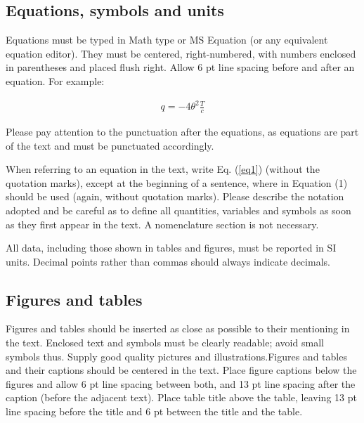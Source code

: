 \documentclass{cilamce19}
\begin{document}
\subsection{Equations, symbols and units} 
Equations must be typed in Math type or MS Equation (or any equivalent equation editor). They must be centered, right-numbered, with numbers enclosed in parentheses and placed flush right. Allow 6 pt line spacing before and after an equation. For example:

\begin{eqnarray}
q =-4 \theta^{2} \frac{T}{c}
\label{eq1}
\end{eqnarray}

Please pay attention to the punctuation after the equations, as equations are part of the text and must be punctuated accordingly.

When referring to an equation in the text, write Eq. (\ref{eq1}) (without the quotation marks), except at the beginning of a sentence, where in  Equation (1) should be used (again, without quotation marks). Please describe the notation adopted and be careful as to define all quantities, variables and symbols as soon as they first appear in the text. A nomenclature section is not necessary.

All data, including those shown in tables and figures, must be reported in SI units. Decimal points rather than commas should always indicate decimals.


\subsection{Figures and tables}

Figures and tables should be inserted as close as possible to their mentioning in the text. Enclosed text and symbols must be clearly readable; avoid small symbols thus. Supply good quality pictures and illustrations.Figures and tables and their captions should be centered in the text. Place figure captions below the figures and allow 6 pt line spacing between both, and 13 pt line spacing after the caption (before the adjacent text). Place table title above the table, leaving 13 pt line spacing before the title and 6 pt between the title and the table.
\end{document}
